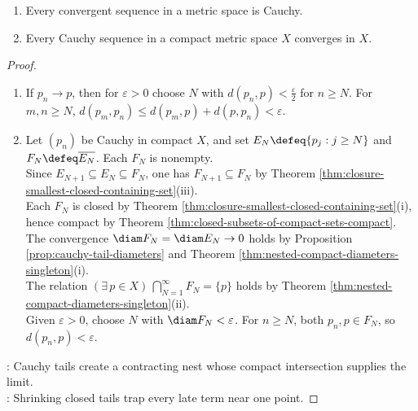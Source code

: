 \begin{theorem} \label{thm:cauchy-convergence-criterion} 
\begin{enumerate}[label=(\roman*)]
\setlength{\itemsep}{0pt}
\item Every convergent sequence in a metric space is Cauchy.
\item Every Cauchy sequence in a compact metric space $X$ converges in $X$.
\end{enumerate}
\begin{proof}
\begin{enumerate}[label=(\roman*)]
\setlength{\itemsep}{0pt}
\item If $p_n\to p$, then for $\varepsilon>0$ choose $N$ with $d(p_n,p)<\frac{\varepsilon}{2}$ for $n\geq N$. For $m,n\geq N$, $d(p_m,p_n)\leq d(p_m,p)+d(p,p_n)<\varepsilon$.
\item Let $(p_n)$ be Cauchy in compact $X$, and set $E_N\defeq\{p_j:j\geq N\}$ and $F_N\defeq\overline{E_N}$. Each $F_N$ is nonempty.\\
Since $E_{N+1}\subseteq E_N\subseteq F_N$, one has $F_{N+1}\subseteq F_N$ by Theorem \ref{thm:closure-smallest-closed-containing-set}(iii).\\
Each $F_N$ is closed by Theorem \ref{thm:closure-smallest-closed-containing-set}(i), hence compact by Theorem \ref{thm:closed-subsets-of-compact-sets-compact}.\\
The convergence $\diam F_N=\diam E_N\to0$ holds by Proposition \ref{prop:cauchy-tail-diameters} and Theorem \ref{thm:nested-compact-diameters-singleton}(i).\\
The relation $(\exists\,p\in X)\,\bigcap\limits_{N=1}^{\infty}F_N=\{p\}$ holds by Theorem \ref{thm:nested-compact-diameters-singleton}(ii).\\
Given $\varepsilon>0$, choose $N$ with $\diam F_N<\varepsilon$. For $n\geq N$, both $p_n,p\in F_N$, so $d(p_n,p)<\varepsilon$.
\end{enumerate}
: Cauchy tails create a contracting nest whose compact intersection supplies the limit.\\
: Shrinking closed tails trap every late term near one point.
\end{proof}
\end{theorem}

